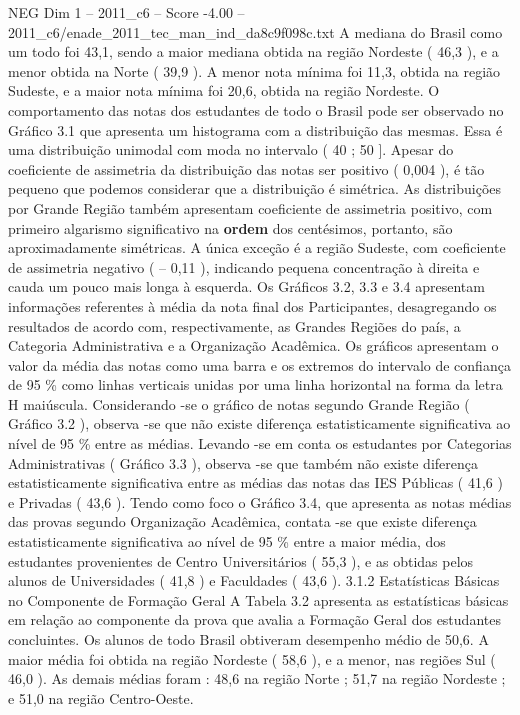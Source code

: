 \begin{textsample}{NEG Dim 1 – 2011\_c6 – Score -4.00 – 2011\_c6/enade\_2011\_tec\_man\_ind\_da8c9f098c.txt}
A mediana do Brasil como um todo foi 43,1, sendo a maior mediana obtida na região Nordeste ( 46,3 ), e a menor obtida na Norte ( 39,9 ).
A menor nota mínima foi 11,3, obtida na região Sudeste, e a maior nota mínima foi 20,6, obtida na região Nordeste.
O comportamento das notas dos estudantes de todo o Brasil pode ser observado no Gráfico 3.1 que apresenta um histograma com a distribuição das mesmas.
Essa é uma distribuição unimodal com moda no intervalo ( 40 ; 50 ].
Apesar do coeficiente de assimetria da distribuição das notas ser positivo ( 0,004 ), é tão pequeno que podemos considerar que a distribuição é simétrica.
As distribuições por Grande Região também apresentam coeficiente de assimetria positivo, com primeiro algarismo significativo na \textbf{ordem} dos centésimos, portanto, são aproximadamente simétricas.
A única exceção é a região Sudeste, com coeficiente de assimetria negativo ( – 0,11 ), indicando pequena concentração à direita e cauda um pouco mais longa à esquerda.
Os Gráficos 3.2, 3.3 e 3.4 apresentam informações referentes à média da nota final dos Participantes, desagregando os resultados de acordo com, respectivamente, as Grandes Regiões do país, a Categoria Administrativa e a Organização Acadêmica.
Os gráficos apresentam o valor da média das notas como uma barra e os extremos do intervalo de confiança de 95 \% como linhas verticais unidas por uma linha horizontal na forma da letra H maiúscula.
Considerando -se o gráfico de notas segundo Grande Região ( Gráfico 3.2 ), observa -se que não existe diferença estatisticamente significativa ao nível de 95 \% entre as médias.
Levando -se em conta os estudantes por Categorias Administrativas ( Gráfico 3.3 ), observa -se que também não existe diferença estatisticamente significativa entre as médias das notas das IES Públicas ( 41,6 ) e Privadas ( 43,6 ).
Tendo como foco o Gráfico 3.4, que apresenta as notas médias das provas segundo Organização Acadêmica, contata -se que existe diferença estatisticamente significativa ao nível de 95 \% entre a maior média, dos estudantes provenientes de Centro Universitários ( 55,3 ), e as obtidas pelos alunos de Universidades ( 41,8 ) e Faculdades ( 43,6 ). 3.1.2 Estatísticas Básicas no Componente de Formação Geral A Tabela 3.2 apresenta as estatísticas básicas em relação ao componente da prova que avalia a Formação Geral dos estudantes concluintes.
Os alunos de todo Brasil obtiveram desempenho médio de 50,6.
A maior média foi obtida na região Nordeste ( 58,6 ), e a menor, nas regiões Sul ( 46,0 ).
As demais médias foram : 48,6 na região Norte ; 51,7 na região Nordeste ; e 51,0 na região Centro-Oeste.

\end{textsample}
